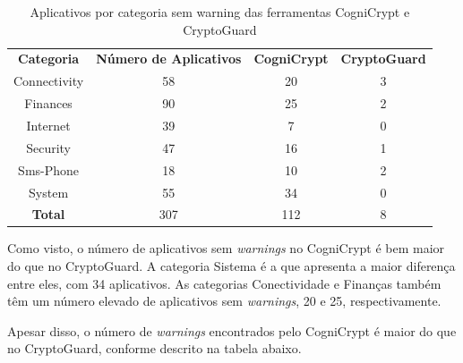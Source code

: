 \begin{table}[!htbp]
  \centering
  \begin{tabular}{|c|c|c|c|}
  
    \textbf{Categoria}   & \textbf{Número de Aplicativos}   &  \textbf{CogniCrypt}     &  \textbf{CryptoGuard} \\ 
     Connectivity           & \num{58}                         &  \num{20}                    & \num{3}                     \\
Finances                & \num{90}                         &  \num{25}                    & \num{2}                     \\
Internet                 & \num{39}                         &  \num{7}                      &     \num{0}                  \\
Security                 & \num{47}                         &  \num{16}                    &     \num{1}                  \\
Sms-Phone            & \num{18}                         &  \num{10}                     &     \num{2}                 \\
System                  & \num{55}                        &   \num{34}                    &     \num{0}                  \\
\textbf{Total}        & \num{307}                      &   \num{112}                  &     \num{8}                   \\
\end{tabular}
    
  \caption{Aplicativos por categoria sem warning das ferramentas CogniCrypt e CryptoGuard}
\label{AplicativosSemWarning}
\end{table}

Como visto, o número de aplicativos sem \textit{warnings} no CogniCrypt é bem maior do que no CryptoGuard. A categoria Sistema é a que apresenta a maior diferença entre eles, com \num{34} aplicativos. As categorias Conectividade e Finanças também têm um número elevado de aplicativos sem \textit{warnings}, \num{20} e \num{25}, respectivamente.

Apesar disso, o número de \textit{warnings} encontrados pelo CogniCrypt é maior do que no CryptoGuard, conforme descrito na tabela abaixo.

